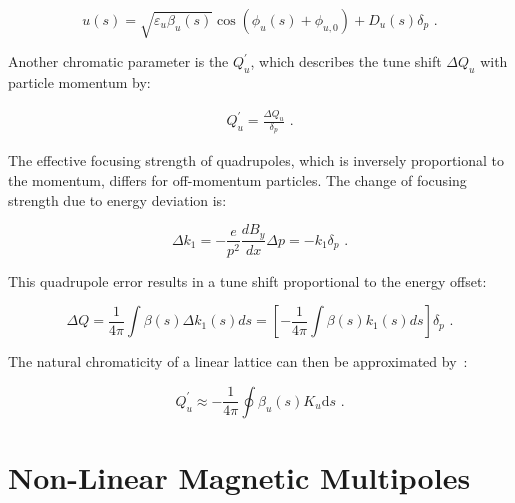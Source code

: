 \begin{equation}
    u(s) = \sqrt{\varepsilon_u \beta_u(s)} \cos \left( \phi_u(s) + \phi_{u, 0} \right) + D_u(s) \delta_p \text{ .}
    \label{equation:hill_solution_with_dispersion}
\end{equation}

Another chromatic parameter is the  \(Q_u^{\prime}\), which describes the tune shift \(\Delta Q_u\) with particle momentum by:

\begin{eqnarray}
    Q^{\prime}_u = \frac{\Delta Q_u}{\delta_p} \text{ .}
    \label{equation:chromaticity_definition}
\end{eqnarray}

The effective focusing strength of quadrupoles, which is inversely proportional to the momentum, differs for off-momentum particles.
The change of focusing strength due to energy deviation is:

\begin{equation}
	\Delta k_{1} = - \dfrac{e}{p^2} \dfrac{d B_{y}}{d x} \Delta p = -k_{1} \delta_p \text{ .}
    \label{equation:quadrupole_focusing_strength_deviation_from_dispersion}
\end{equation}

This quadrupole error results in a tune shift proportional to the energy offset:

\begin{equation}
	\Delta Q = \dfrac{1}{4 \pi} \int \beta(s) \Delta k_{1}(s) ds = \left[ - \frac{1}{4 \pi} \int \beta(s) k_{1}(s) ds \right] \delta_p \text{ .}
    \label{equation:tune_shift_from_dispersion}
\end{equation}

The natural chromaticity of a linear lattice can then be approximated by~\cite{CAS:Guiducci:Chromaticity}:

\begin{equation}
    Q_u^{\prime} \approx -\frac{1}{4 \pi} \oint \beta_u(s) K_u \mathrm{d}s \text{ .}
    \label{equation:natural_chromaticity_approximation}
\end{equation}


\section{Non-Linear Magnetic Multipoles}
\label{section:non_linear_magnetic_multipoles}

